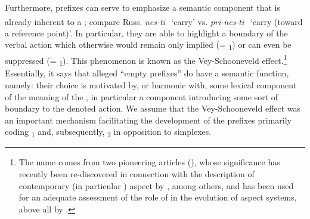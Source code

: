 \documentclass[output=paper]{langsci/langscibook}
\begin{document}
Furthermore, prefixes can serve to emphasize a semantic component that is already inherent to a ; compare Russ. \textit{nes-ti}{\textsuperscript{~}\IPFV} ‘carry’ vs. \textit{pri-nes-ti}{\textsuperscript{~}\PFV} ‘carry (toward a reference point)’. In particular, they are able to highlight a boundary of the verbal action which otherwise would remain only implied (= \textsubscript{1}) or can even be suppressed (= \textsubscript{1}). This phenomenon is known as the Vey-Schooneveld effect.\footnote{The name comes from two pioneering articles (\citealt{Vey1952,vanSchooneveld1958}), whose significance has recently been re-discovered in connection with the description of contemporary  (in particular ) aspect by \citet{JandaEtAl2013}, among others, and has been used for an adequate assessment of the role of  in the evolution of aspect systems, above all by \citet{Arkadiev2015}.} Essentially, it says that alleged “empty prefixes” do have a semantic function, namely: their choice is motivated by, or harmonic with, some lexical component of the meaning of the , in particular a component introducing some sort of boundary to the denoted action. We assume that the Vey-Schooneveld effect was an important mechanism facilitating the development of the prefixes primarily coding \textsubscript{1} and, subsequently, \textsubscript{2} in opposition to simplexes.
\end{document}
